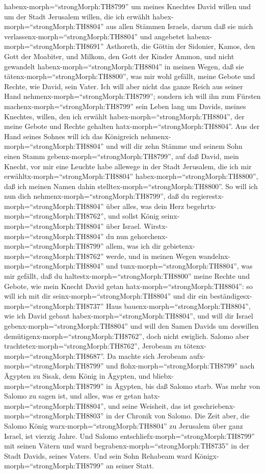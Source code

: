 habenx-morph=``strongMorph:TH8799'' um meines Knechtes David willen und
um der Stadt Jerusalem willen, die ich erwählt
habex-morph=``strongMorph:TH8804'' aus allen Stämmen Israels,
 darum daß sie mich verlassenx-morph=``strongMorph:TH8804''
und angebetet habenx-morph=``strongMorph:TH8691'' Asthoreth, die Göttin
der Sidonier, Kamos, den Gott der Moabiter, und Milkom, den Gott der
Kinder Ammon, und nicht gewandelt habenx-morph=``strongMorph:TH8804'' in
meinen Wegen, daß sie tätenx-morph=``strongMorph:TH8800'', was mir wohl
gefällt, meine Gebote und Rechte, wie David, sein Vater. 
Ich will aber nicht das ganze Reich aus seiner Hand
nehmenx-morph=``strongMorph:TH8799''; sondern ich will ihn zum Fürsten
machenx-morph=``strongMorph:TH8799'' sein Leben lang um Davids, meines
Knechtes, willen, den ich erwählt habex-morph=``strongMorph:TH8804'',
der meine Gebote und Rechte gehalten hatx-morph=``strongMorph:TH8804''.
 Aus der Hand seines Sohnes will ich das Königreich
nehmenx-morph=``strongMorph:TH8804'' und will dir zehn Stämme
 und seinem Sohn einen Stamm
gebenx-morph=``strongMorph:TH8799'', auf daß David, mein Knecht, vor mir
eine Leuchte habe allewege in der Stadt Jerusalem, die ich mir
erwähltx-morph=``strongMorph:TH8804''
habex-morph=``strongMorph:TH8800'', daß ich meinen Namen dahin
stelltex-morph=``strongMorph:TH8800''.  So will ich nun
dich nehmenx-morph=``strongMorph:TH8799'', daß du
regierestx-morph=``strongMorph:TH8804'' über alles, was dein Herz
begehrtx-morph=``strongMorph:TH8762'', und sollst König
seinx-morph=``strongMorph:TH8804'' über Israel. 
Wirstx-morph=``strongMorph:TH8804'' du nun
gehorchenx-morph=``strongMorph:TH8799'' allem, was ich dir
gebietenx-morph=``strongMorph:TH8762'' werde, und in meinen Wegen
wandelnx-morph=``strongMorph:TH8804'' und
tunx-morph=``strongMorph:TH8804'', was mir gefällt, daß du
haltestx-morph=``strongMorph:TH8800'' meine Rechte und Gebote, wie mein
Knecht David getan hatx-morph=``strongMorph:TH8804'': so will ich mit
dir seinx-morph=``strongMorph:TH8804'' und dir ein
beständigesx-morph=``strongMorph:TH8737'' Haus
bauenx-morph=``strongMorph:TH8804'', wie ich David gebaut
habex-morph=``strongMorph:TH8804'', und will dir Israel
gebenx-morph=``strongMorph:TH8804''  und will den Samen
Davids um deswillen demütigenx-morph=``strongMorph:TH8762'', doch nicht
ewiglich.  Salomo aber
trachtetex-morph=``strongMorph:TH8762'', Jerobeam zu
tötenx-morph=``strongMorph:TH8687''. Da machte sich Jerobeam
aufx-morph=``strongMorph:TH8799'' und flohx-morph=``strongMorph:TH8799''
nach Ägypten zu Sisak, dem König in Ägypten, und
bliebx-morph=``strongMorph:TH8799'' in Ägypten, bis daß Salomo starb.
 Was mehr von Salomo zu sagen ist, und alles, was er getan
hatx-morph=``strongMorph:TH8804'', und seine Weisheit, das ist
geschriebenx-morph=``strongMorph:TH8803'' in der Chronik von Salomo.
 Die Zeit aber, die Salomo König
warx-morph=``strongMorph:TH8804'' zu Jerusalem über ganz Israel, ist
vierzig Jahre.  Und Salomo
entschliefx-morph=``strongMorph:TH8799'' mit seinen Vätern und ward
begrabenx-morph=``strongMorph:TH8735'' in der Stadt Davids, seines
Vaters. Und sein Sohn Rehabeam ward Königx-morph=``strongMorph:TH8799''
an seiner Statt.

